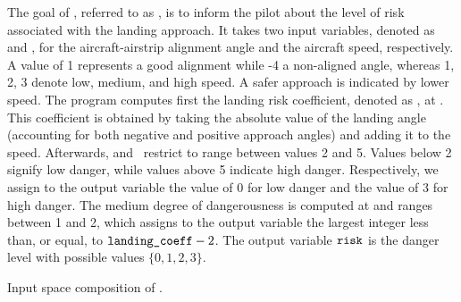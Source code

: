 The goal of , referred to as \landingprogram, is to inform the pilot about the level of risk associated with the landing approach.
It takes two input variables, denoted as \x{} and \y, for the aircraft-airstrip alignment angle and the aircraft speed, respectively.
A value of 1 represents a good alignment while -4 a non-aligned angle, whereas 1, 2, 3 denote low, medium, and high speed.
A safer approach is indicated by lower speed.
The program \landingprogram{} computes first the landing risk coefficient, denoted as \lc, at .
This coefficient is obtained by taking the absolute value of the landing angle (accounting for both negative and positive approach angles) and adding it to the speed.
Afterwards,  and~ restrict \lc{} to range between values 2 and 5.
Values below 2 signify low danger, while values above 5 indicate high danger.
Respectively, we assign to the output variable \z{} the value of 0 for low danger and the value of 3 for high danger.
The medium degree of dangerousness is computed at  and ranges between 1 and 2, which assigns to the output variable \z{} the largest integer less than, or equal, to $\texttt{landing\_coeff}-2$.
The output variable $\texttt{risk}{}$ is the danger level with possible values $\{0, 1, 2, 3\}$.

\begin{marginfigure}
\centering
{}
\caption{Input space composition of .}
\end{marginfigure}

